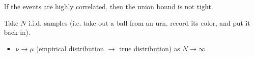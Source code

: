 \begin{warning}
    If the events are highly correlated, then the union bound is not tight.
\end{warning}
\newpage

\begin{example}
    Take $N$ i.i.d. samples (i.e. take out a ball from an urn, record its color, and put it back in).
    \begin{itemize}
        \item $\nu \rightarrow \mu$ (empirical distribution $\rightarrow$ true distribution) as $N \rightarrow \infty$
    \end{itemize}
\end{example}



